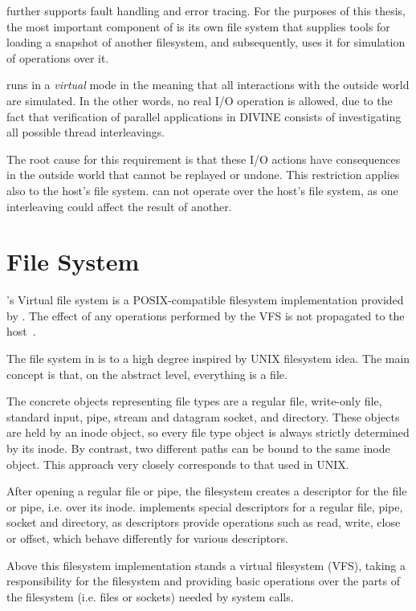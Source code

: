 \dios further supports fault handling and error tracing. For the purposes of this thesis, the most important component of \dios is its own file system that supplies tools for loading a snapshot of another filesystem, and subsequently, uses it for simulation of operations over it.

\dios runs in a \textit{virtual} mode in the meaning that all interactions with the outside world are simulated. In the other words, no real I/O operation is allowed, due to the fact that verification of parallel applications in DIVINE consists of investigating all possible thread interleavings.

The root cause for this requirement is that these  I/O actions have consequences in the outside world that cannot be replayed or undone. 
This restriction applies also to the host's file system. \dios can not operate over the host's file system, as one interleaving could affect the result of another.
 
\section{File System} \label{sec:divine:filesystem}

\divine's Virtual file system is a POSIX-compatible filesystem implementation provided by \dios. The effect of any operations performed by the VFS is not propagated to the host~\cite{Divine}. 

The file system in \divine is to a high degree inspired by UNIX filesystem idea. The main concept is that, on the abstract level, everything is a file. 

The concrete objects representing file types are a regular file, write-only file, standard input, pipe, stream and datagram socket, and directory. These objects are held by an inode object, so every file type object is always strictly determined by its inode. By contrast, two different paths can be bound to the same inode object. This approach very closely corresponds to that used in UNIX. 

After opening a regular file or pipe, the filesystem creates a descriptor for the file or pipe, i.e. over its inode. \divine implements special descriptors for a regular file, pipe, socket and directory, as descriptors provide operations such as read, write, close or offset, which behave differently for various descriptors.

Above this filesystem implementation stands a virtual filesystem (VFS), taking a responsibility for the filesystem and providing basic operations over the parts of the filesystem (i.e. files or sockets) needed by system calls.

